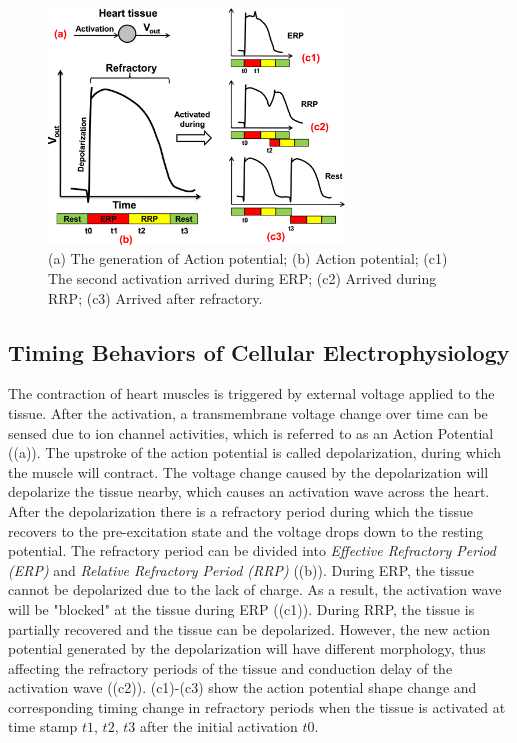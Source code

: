 \begin{figure}[!t]
\center
\includegraphics[width=0.7\textwidth]{figs/refractory.png}
\caption{(a) The generation of Action potential; (b) Action potential; (c1) The second activation arrived during ERP; (c2) Arrived during RRP; (c3) Arrived after refractory.}
\label{fig:refractory}
\end{figure} 
\subsection{Timing Behaviors of Cellular Electrophysiology}
The contraction of heart muscles is triggered by external voltage applied to the tissue. After the activation, a transmembrane voltage change over time can be sensed due to ion channel activities, which is referred to as an Action Potential ((a)). The upstroke of the action potential is called depolarization, during which the muscle will contract. The voltage change caused by the depolarization will depolarize the tissue nearby, which causes an activation wave across the heart. After the depolarization there is a refractory period during which the tissue recovers to the pre-excitation state and the voltage drops down to the resting potential. The refractory period can be divided into \emph{Effective Refractory Period (ERP)} and \emph{Relative Refractory Period (RRP)} ((b)). During ERP, the tissue cannot be depolarized due to the lack of charge. As a result, the activation wave will be "blocked" at the tissue during ERP ((c1)). During RRP, the tissue is partially recovered and the tissue can be depolarized. However, the new action potential generated by the depolarization will have different morphology, thus affecting the refractory periods of the tissue and conduction delay of the activation wave ((c2)). (c1)-(c3) show the action potential shape change and corresponding timing change in refractory periods when the tissue is activated at time stamp $t1$, $t2$, $t3$ after the initial activation $t0$. 

